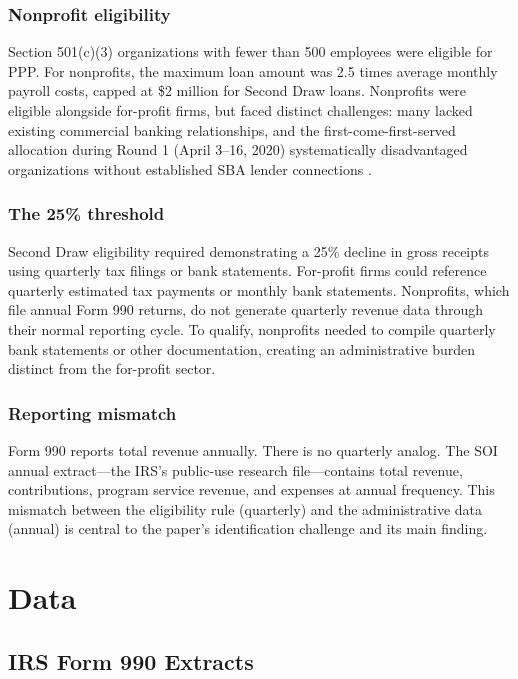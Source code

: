 \documentclass[12pt]{article}
\begin{document}
\subsubsection*{Nonprofit eligibility} Section 501(c)(3) organizations with fewer than 500 employees were eligible for PPP. For nonprofits, the maximum loan amount was 2.5 times average monthly payroll costs, capped at \$2 million for Second Draw loans. Nonprofits were eligible alongside for-profit firms, but faced distinct challenges: many lacked existing commercial banking relationships, and the first-come-first-served allocation during Round 1 (April 3--16, 2020) systematically disadvantaged organizations without established SBA lender connections \citep{greer2020}.

\subsubsection*{The 25\% threshold} Second Draw eligibility required demonstrating a 25\% decline in gross receipts using quarterly tax filings or bank statements. For-profit firms could reference quarterly estimated tax payments or monthly bank statements. Nonprofits, which file annual Form 990 returns, do not generate quarterly revenue data through their normal reporting cycle. To qualify, nonprofits needed to compile quarterly bank statements or other documentation, creating an administrative burden distinct from the for-profit sector.

\subsubsection*{Reporting mismatch} Form 990 reports total revenue annually. There is no quarterly analog. The SOI annual extract---the IRS's public-use research file---contains total revenue, contributions, program service revenue, and expenses at annual frequency. This mismatch between the eligibility rule (quarterly) and the administrative data (annual) is central to the paper's identification challenge and its main finding.


\section{Data}

\subsection{IRS Form 990 Extracts}
\end{document}
